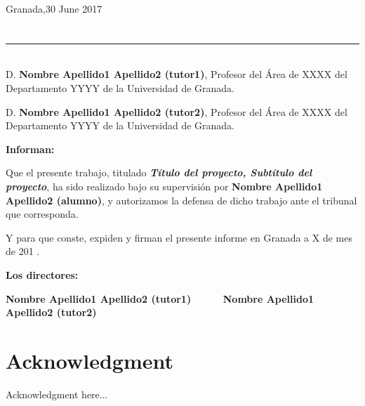 \begin{flushright}
Granada,30 June 2017
\end{flushright}


\chapter*{}
\thispagestyle{empty}

\noindent\rule[-1ex]{\textwidth}{2pt}\\[4.5ex]

D. \textbf{Nombre Apellido1 Apellido2 (tutor1)}, Profesor del Área de XXXX del Departamento YYYY de la Universidad de Granada.

\vspace{0.5cm}

D. \textbf{Nombre Apellido1 Apellido2 (tutor2)}, Profesor del Área de XXXX del Departamento YYYY de la Universidad de Granada.


\vspace{0.5cm}

\textbf{Informan:}

\vspace{0.5cm}

Que el presente trabajo, titulado \textit{\textbf{Título del proyecto, Subtítulo del proyecto}},
ha sido realizado bajo su supervisión por \textbf{Nombre Apellido1 Apellido2 (alumno)}, y autorizamos la defensa de dicho trabajo ante el tribunal
que corresponda.

\vspace{0.5cm}

Y para que conste, expiden y firman el presente informe en Granada a X de mes de 201 .

\vspace{1cm}

\textbf{Los directores:}

\vspace{5cm}

\noindent \textbf{Nombre Apellido1 Apellido2 (tutor1) \ \ \ \ \ Nombre Apellido1 Apellido2 (tutor2)}

\chapter*{Acknowledgment}
\thispagestyle{empty}

       \vspace{1cm}


Acknowledgment here...
